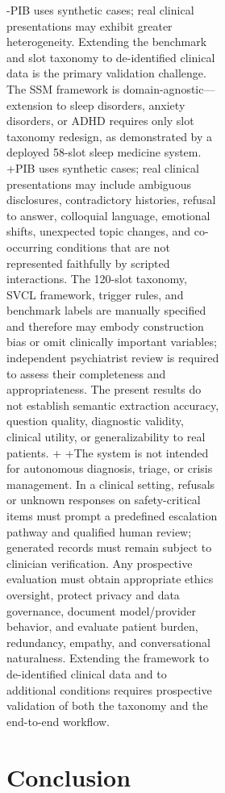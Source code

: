 \begin{figure}[t]
{\begin{figure}[!t]
{\begin{figure}[!t]
{-PIB uses synthetic cases; real clinical presentations may exhibit greater heterogeneity. Extending the benchmark and slot taxonomy to de-identified clinical data is the primary validation challenge. The SSM framework is domain-agnostic---extension to sleep disorders, anxiety disorders, or ADHD requires only slot taxonomy redesign, as demonstrated by a deployed 58-slot sleep medicine system.
+PIB uses synthetic cases; real clinical presentations may include ambiguous disclosures, contradictory histories, refusal to answer, colloquial language, emotional shifts, unexpected topic changes, and co-occurring conditions that are not represented faithfully by scripted interactions. The 120-slot taxonomy, SVCL framework, trigger rules, and benchmark labels are manually specified and therefore may embody construction bias or omit clinically important variables; independent psychiatrist review is required to assess their completeness and appropriateness. The present results do not establish semantic extraction accuracy, question quality, diagnostic validity, clinical utility, or generalizability to real patients.
+
+The system is not intended for autonomous diagnosis, triage, or crisis management. In a clinical setting, refusals or unknown responses on safety-critical items must prompt a predefined escalation pathway and qualified human review; generated records must remain subject to clinician verification. Any prospective evaluation must obtain appropriate ethics oversight, protect privacy and data governance, document model/provider behavior, and evaluate patient burden, redundancy, empathy, and conversational naturalness. Extending the framework to de-identified clinical data and to additional conditions requires prospective validation of both the taxonomy and the end-to-end workflow.
 
 
 \section{Conclusion}
 
}
\end{figure}}
\end{figure}}
\end{figure}
